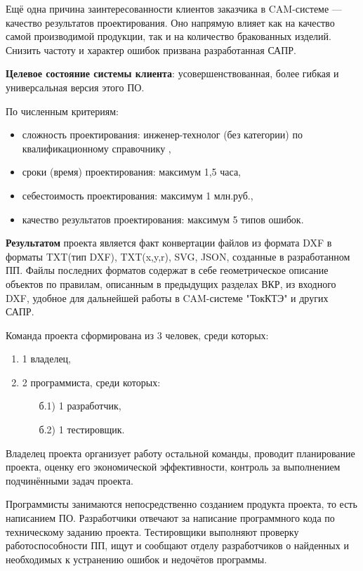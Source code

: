 Ещё одна причина заинтересованности клиентов заказчика в CAM-системе --- качество результатов проектирования. Оно напрямую влияет как на качество самой производимой продукции, так и на количество бракованных изделий. Снизить частоту и характер ошибок призвана разработанная САПР.

\textbf{Целевое состояние системы клиента}: усовершенствованная, более гибкая и универсальная версия этого ПО.

По численным критериям:
\begin{itemize}
	\item сложность проектирования: инженер-технолог (без категории) по квалификационному справочнику \cite{qualification},
	\item сроки (время) проектирования: максимум 1,5 часа,
	\item себестоимость проектирования: максимум 1 млн.руб.,
	\item качество результатов проектирования: максимум 5 типов ошибок.
\end{itemize}

\textbf{Результатом} проекта является факт конвертации файлов из формата DXF в форматы TXT(тип DXF), TXT(x,y,r), SVG, JSON, созданные в разработанном ПП. Файлы последних форматов содержат в себе геометрическое описание объектов по правилам, описанным в предыдущих разделах ВКР, из входного DXF, удобное для дальнейшей работы в CAM-системе "ТокКТЭ" и других САПР.

Команда проекта сформирована из 3 человек, среди которых:
\begin{enumerate}
	\item 1 владелец,
	\item 2 программиста, среди которых:
	\begin{enumerate}
		\item[б.1)] 1 разработчик,
		\item[б.2)] 1 тестировщик.
	\end{enumerate}
\end{enumerate}

Владелец проекта организует работу остальной команды, проводит планирование проекта, оценку его экономической эффективности, контроль за выполнением подчинёнными задач проекта.

Программисты занимаются непосредственно созданием продукта проекта, то есть написанием ПО. Разработчики отвечают за написание программного кода по техническому заданию проекта. Тестировщики выполняют проверку работоспособности ПП, ищут и сообщают отделу разработчиков о найденных и необходимых к устранению ошибок и недочётов программы.

